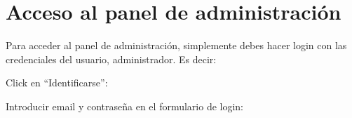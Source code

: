 \documentclass[12pt, spanish]{article}
\begin{document}
\section{Acceso al panel de administración}

Para acceder al panel de administración, simplemente debes hacer login con las credenciales
del usuario, administrador. Es decir:

\begin{steps}
    \item Click en ``Identificarse'':

        \medskip
        \begin{minipage}[t]{\linewidth}
        \raggedright
    \end{minipage}
    \item Introducir email y contraseña en el formulario de login:

        \medskip
        \begin{minipage}[t]{\linewidth}
        \raggedright
    \end{minipage}
\end{steps}
\end{document}
